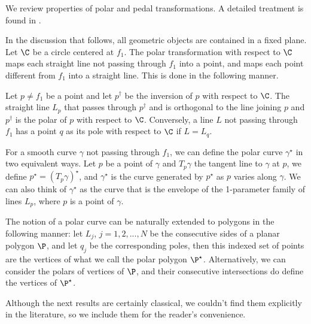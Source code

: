 
We review properties of polar and pedal transformations. A detailed treatment is found in \cite{akopyan2007-conics,stachel2019-conics}.

In the discussion that follows, all geometric objects are contained in a fixed plane. Let $\C$ be a circle centered at $f_1$. The polar transformation with respect to $\C$ maps each straight line not passing through $f_1$ into a point, and maps each point different from $f_1$ into a straight line. This is done in the following manner.

 Let $p\neq f_{1}$ be a point and let ${p}^\dagger$ be the inversion of $p$ with respect to $\C$. The straight line $L_{p}$ that passes through ${p}^\dagger$ and is orthogonal to the line joining $p$ and ${p}^\dagger$ is the polar of $p$ with respect to $\C$. Conversely, a line $L$ not passing through $f_1$ has a point $q$ as its pole with respect to $\C$ if $L=L_{q}$.

For a smooth curve $\gamma$ not passing through $f_1$, we can define the polar curve $\gamma^{\star}$ in two equivalent ways. Let $p$ be a point of $\gamma$ and $T_{p}\gamma$ the tangent line to $\gamma$ at $p$, we define $p^{\star}=(T_{p}\gamma)^{\star}$, and $\gamma^{\star}$ is the curve generated by $p^{\star}$ as $p$ varies along $\gamma$. We can also think of $\gamma^{\star}$ as the curve that is the envelope of the 1-parameter family of lines $L_{p}$, where $p$ is a point of $\gamma$.

The notion of a polar curve can be naturally extended to polygons in the following manner: let $L_{j}$, $j=1,2,...,N$ be the consecutive sides of a planar polygon $\P$, and let $q_{j}$ be the corresponding poles, then this indexed set of points are the vertices of what we call the polar polygon $\P^{\star}$. Alternatively, we can consider the polars of vertices of $\P$, and their consecutive intersections do define the vertices of $\P^{\star}$.


Although the next results are certainly classical, we couldn't find them explicitly in the literature, so we include them for the reader's convenience.

